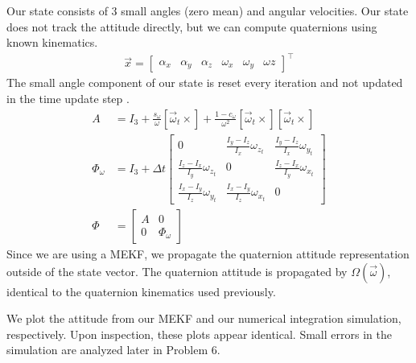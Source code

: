 Our state consists of 3 small angles (zero mean) and angular velocities. Our state does not track the attitude directly, but we can compute quaternions using known kinematics.
\begin{align*}
    \Vec{x} = \begin{bmatrix}
        \alpha_{x} & \alpha_{y} & \alpha_{z} & \omega_{x} & \omega_{y} & \omega{z}
    \end{bmatrix}^{\intercal}
\end{align*}
The small angle component of our state is reset every iteration and not updated in the time update step \cite{CubeSatTelescope}.
\begin{align*}
    A &= I_{3} + \frac{s_{\omega}}{\omega} [\Vec{\omega}_{t} \times] + \frac{1 - c_{\omega}}{\omega^{2}} [\Vec{\omega}_{t} \times] [\Vec{\omega}_{t} \times] \\
    \Phi_{\omega} & = I_{3} + \Delta t \begin{bmatrix}
        0 & \frac{I_{y} - I_{z}}{I_x} \omega_{z_{t}} & \frac{I_{y} - I_{z}}{I_x} \omega_{y_{t}} \\
        \frac{I_{z} - I_{x}}{I_y} \omega_{z_{t}} & 0 & \frac{I_{z} - I_{x}}{I_y} \omega_{x_{t}} \\
        \frac{I_{x} - I_{y}}{I_z} \omega_{y_{t}} & \frac{I_{x} - I_{y}}{I_z} \omega_{x_{t}} & 0
    \end{bmatrix} \\
    \Phi &= \begin{bmatrix}
        A & 0 \\
        0 & \Phi_{\omega}
    \end{bmatrix}
\end{align*}
Since we are using a MEKF, we propagate the quaternion attitude representation outside of the state vector. The quaternion attitude is propagated by $\Omega (\Vec{\omega})$, identical to the quaternion kinematics used previously.

We plot the attitude from our MEKF and our numerical integration simulation, respectively. Upon inspection, these plots appear identical. Small errors in the simulation are analyzed later in Problem 6.

